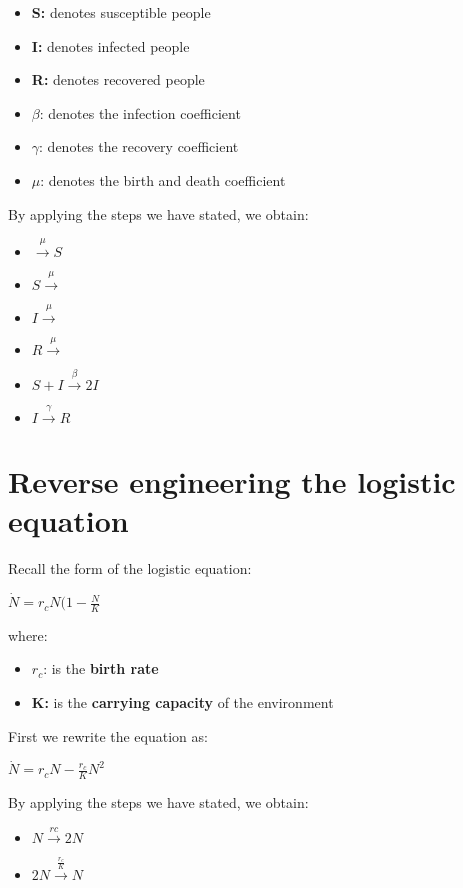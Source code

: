 \begin{itemize}
    \item \textbf{S:} denotes susceptible people
    \item \textbf{I:} denotes infected people
    \item \textbf{R:} denotes recovered people
    \item $\beta$: denotes the infection coefficient
    \item $\gamma$: denotes the recovery coefficient
    \item $\mu$: denotes the birth and death coefficient
\end{itemize}

By applying the steps we have stated, we obtain:

\begin{itemize}
    \item $\xrightarrow{\mu} S$
    \item $S \xrightarrow{\mu}$
    \item $I \xrightarrow{\mu}$
    \item $R \xrightarrow{\mu}$
    \item $S + I \xrightarrow{\beta} 2 I$
    \item $I \xrightarrow{\gamma} R$
\end{itemize}

\section{Reverse engineering the logistic equation}
Recall the form of the logistic equation:
\begin{center}
    $\dot{N} = r_{c} N (1 - \frac{N}{K}$
\end{center}

where:
\begin{itemize}
    \item $r_c$: is the \textbf{birth rate}
    \item \textbf{K:} is the \textbf{carrying capacity} of the environment
\end{itemize}

First we rewrite the equation as:
\begin{center}
    $\dot{N} = r_{c} N - \frac{r_c}{K} N^{2}$
\end{center}

By applying the steps we have stated, we obtain:
\begin{itemize}
    \item $N \xrightarrow{rc} 2N$
    \item $2N \xrightarrow{\frac{r_{c}}{K}}N$
\end{itemize}
